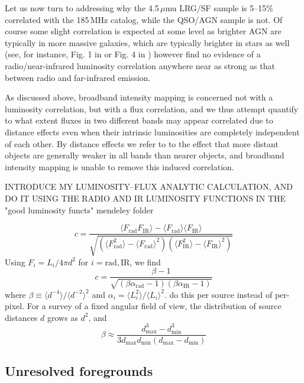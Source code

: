 \documentclass[preprint]{aastex}
\newcommand{\mintext}{\text{min}}
\newcommand{\maxtext}{\text{max}}
\newcommand{\rad}{\text{rad}}
\newcommand{\ir}{\text{IR}}
\begin{document}
Let us now turn to addressing why the 4.5\,$\mu$mu LRG/SF sample is 5--15\% correlated with the 185\,MHz catalog, while the QSO/AGN sample is not. Of course some slight correlation is expected at some level as brighter AGN are typically in more massive galaxies, which are typically brighter in stars as well (see, for instance, Fig. 1 in \citep{seymour07} or Fig. 4 in \citep{Willott03}) however \citet{mauch07} find no evidence of a radio/near-infrared luminosity correlation anywhere near as strong as that between radio and far-infrared emission. 

As discussed above, broadband intensity mapping is concerned not with a luminosity correlation, but with a flux correlation, and we thus attempt quantify to what extent fluxes in two different bands may appear correlated due to distance effects even when their intrinsic luminosities are completely independent of each other. By distance effects we refer to to the effect that more distant objects are generally weaker in all bands than nearer objects, and broadband intensity mapping is unable to remove this induced correlation.

INTRODUCE MY LUMINOSITY--FLUX ANALYTIC CALCULATION, AND DO IT USING THE RADIO AND IR LUMINOSITY FUNCTIONS IN THE "good luminosity functs" mendeley folder

\begin{equation}
	c = \frac{\langle F_\rad F_\ir \rangle-\langle F_\rad\rangle\langle F_\ir\rangle}{\sqrt{(\langle F_\rad^2\rangle-\langle F_\rad\rangle^2)(\langle F_\ir^2\rangle-\langle F_\ir\rangle^2)}}
\end{equation}
Using $F_i=L_i/4\pi d^2$ for $i=\rad,\ir$, we find
\begin{equation}
	c = \frac{\beta-1}{\sqrt{(\beta\alpha_\rad-1)(\beta\alpha_\ir-1)}}
\end{equation}
where $\beta\equiv\langle d^{-4}\rangle/\langle d^{-2}\rangle^2$ and $\alpha_i=\langle L_i^2\rangle/\langle L_i\rangle^2$.
do this per source instead of per-pixel. For a survey of a fixed angular field of view, the distribution of source distances $d$ grows as $d^2$, and 
\begin{equation}
	\beta\approx\frac{d_\maxtext^3-d_\mintext^3}{3d_\maxtext d_\mintext (d_\maxtext-d_\mintext)}
\end{equation}



\subsection{Unresolved foregrounds}
\end{document}
